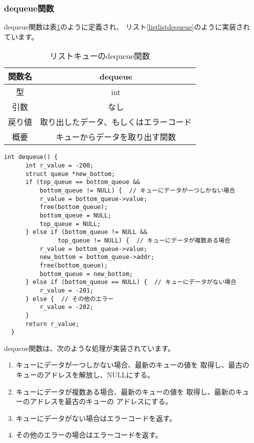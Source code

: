 \documentclass[a4j]{jarticle}
\begin{document}
\subsubsection{dequeue関数}
dequeue関数は表\ref{table:listdequeue}のように定義され、
リスト\ref{listlistdequeue}のように実装されています。

\begin{table}[htbp]
  \centering
  \caption{リストキューのdequeue関数}
  \label{table:listdequeue}
  \begin{tabular}{|c|c|}
    \hline
    関数名 & dequeue             \\
    \hline
    型   & int                 \\
    \hline
    引数  & なし                  \\
    \hline
    戻り値 & 取り出したデータ、もしくはエラーコード \\
    \hline
    概要  & キューからデータを取り出す関数     \\
    \hline
  \end{tabular}
\end{table}

\begin{lstlisting}[caption=リストキューのdequeue関数の実装,label=listlistdequeue]
  int dequeue() {
      int r_value = -200;
      struct queue *new_bottom;
      if (top_queue == bottom_queue &&
          bottom_queue != NULL) {  // キューにデータが一つしかない場合
          r_value = bottom_queue->value;
          free(bottom_queue);
          bottom_queue = NULL;
          top_queue = NULL;
      } else if (bottom_queue != NULL &&
               top_queue != NULL) {  // キューにデータが複数ある場合
          r_value = bottom_queue->value;
          new_bottom = bottom_queue->addr;
          free(bottom_queue);
          bottom_queue = new_bottom;
      } else if (bottom_queue == NULL) {  // キューにデータがない場合
          r_value = -201;
      } else {  // その他のエラー
          r_value = -202;
      }
      return r_value;
  }
\end{lstlisting}

dequeue関数は、次のような処理が実装されています。
\begin{enumerate}
  \item キューにデータが一つしかない場合、最新のキューの値を
        取得し、最古のキューのアドレスを解放し、NULLにする。
  \item キューにデータが複数ある場合、最新のキューの値を
        取得し、最新のキューのアドレスを最古のキューの
        アドレスにする。
  \item キューにデータがない場合はエラーコードを返す。
  \item その他のエラーの場合はエラーコードを返す。
\end{enumerate}
\end{document}
